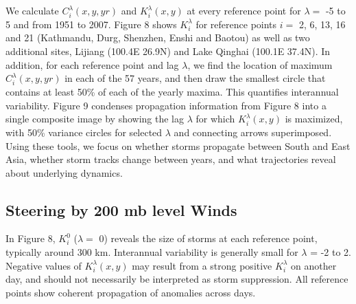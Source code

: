 	We calculate $C_i^\lambda(x,y,yr)$ and $K_i^\lambda(x,y)$ at every reference point for $\lambda =$ -5 to 5 and from 1951 to 2007. Figure 8 shows $K_i^\lambda$ for reference points $i=$ 2, 6, 13, 16 and 21 (Kathmandu, Durg, Shenzhen, Enshi and Baotou) as well as two additional sites, Lijiang (100.4\textdegree E 26.9\textdegree N) and Lake Qinghai (100.1\textdegree E 37.4\textdegree N). In addition, for each reference point and lag $\lambda$, we find the location of maximum $C_i^\lambda(x,y,yr)$ in each of the 57 years, and then draw the smallest circle that contains at least 50\% of each of the yearly maxima. This quantifies interannual variability. Figure 9 condenses propagation information from Figure 8 into a single composite image by showing the lag $\lambda$ for which $K_i^\lambda(x,y)$ is maximized, with 50\% variance circles for selected $\lambda$ and connecting arrows superimposed. Using these tools, we focus on whether storms propagate between South and East Asia, whether storm tracks change between years, and what trajectories reveal about underlying dynamics.
	
\subsection{Steering by 200 mb level Winds}	
		 	 		
	 In Figure 8, $K_i^0$ ($\lambda =$ 0) reveals the size of storms at each reference point, typically around 300 km. Interannual variability is generally small for $\lambda$ = -2 to 2. Negative values of $K_i^\lambda(x,y)$ may result from a strong positive $K_i^{\lambda}$  on another day, and should not necessarily be interpreted as storm suppression. All reference points show coherent propagation of anomalies across days. 
	 
